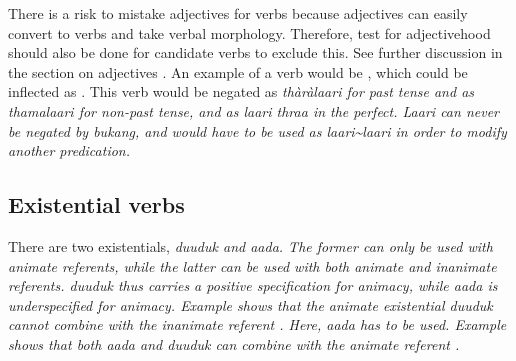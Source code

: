 There is a risk to mistake adjectives for verbs because adjectives can easily convert to verbs and take verbal morphology. Therefore, test for adjectivehood should also be done for candidate verbs to exclude this. See further discussion in the section on adjectives . An example of a verb would be , which could be inflected as . This verb would be negated as \em thàràlaari \em for past tense and as \em thamalaari \em for non-past tense, and as \em laari thraa \em in the perfect. \em Laari  \em can never be negated by \em bukang\em, and would have to be used as \em laari\~{}laari \em in order to modify another predication.

\subsection{Existential verbs}\label{sec:wc:Existentialverbs:intro}
There are two existentials,  \em duuduk \em and \em aada\em. The former can only be used with animate referents, while the latter  can be used with both animate and inanimate referents. \em duuduk \em thus carries a positive specification for animacy, while \em aada \em is underspecified for animacy.
Example  shows that the animate existential \em duuduk \em cannot combine with the inanimate referent . Here, \em aada \em has to be used. Example  shows that both \em aada \em and \em duuduk \em can combine with the animate referent .

 \\

 \\


